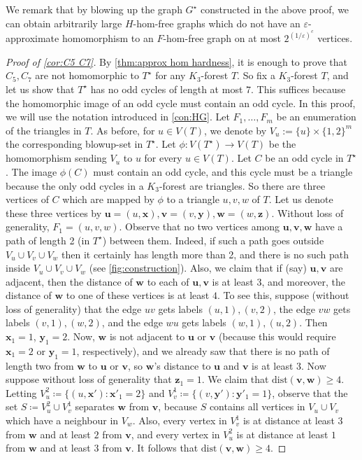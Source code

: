 \documentclass[reqno, english, 12pt]{amsart}
\theoremstyle{plain}
\theoremstyle{remark}
\newcommand{\bx}{\mathbf{x}}
\newcommand{\by}{\mathbf{y}}
\newcommand{\bz}{\mathbf{z}}
\renewcommand{\geq}{\geqslant}
\newcommand{\e}{\ensuremath{\varepsilon}}
\begin{document}
	We remark that by blowing up the graph $G^\star$ constructed in the above proof, we can obtain arbitrarily large $H$-hom-free graphs which do not have an $\e$-approximate homomorphism to an $F$-hom-free graph on at most $2^{(1/\e)^c}$ vertices.
	\begin{proof}[Proof of \cref{cor:C5 C7}]
	By \cref{thm:approx hom hardness}, it is enough to prove that $C_5,C_7$ are not homomorphic to $T^{\star}$ for any $K_3$-forest $T$. 
    So fix a $K_3$-forest $T$, and let us show that $T^{\star}$ has no odd cycles of length at most $7$. This suffices because the homomorphic image of an odd cycle must contain an odd cycle. In this proof, we will use the notation introduced in \cref{con:HG}.
    Let $F_1,\dots,F_m$ be an enumeration of the triangles in $T$.
	As before, for $u \in V(T)$, we denote by $V_u := \{u\} \times \{1,2\}^m$ the corresponding blowup-set in $T^{\star}$. Let $\phi : V(T^{\star}) \rightarrow V(T)$ be the homomorphism sending $V_u$ to $u$ for every $u \in V(T)$. Let $C$ be an odd cycle in $T^{\star}$. 
	The image $\phi(C)$ must contain an odd cycle, and this cycle must be a triangle because the only odd cycles in a $K_3$-forest are triangles. So there are three vertices of $C$ which are mapped by $\phi$ to a triangle $u,v,w$ of $T$. Let us denote these three vertices by $\mathbf{u} = (u,\bx),\mathbf{v} = (v,\by),\mathbf{w} = (w,\bz)$. Without loss of generality, $F_1 = (u,v,w)$. Observe that no two vertices among $\mathbf{u},\mathbf{v},\mathbf{w}$ have a path of length 2 
	(in $T^{\star}$) between them. Indeed, if such a path goes outside $V_u \cup V_v \cup V_w$ then it certainly has length more than 2, and there is no such path inside $V_u \cup V_v \cup V_w$ (see \cref{fig:construction}).
	Also, we claim that if (say) $\mathbf{u},\mathbf{v}$ are adjacent, then the distance of $\mathbf{w}$ to each of $\mathbf{u},\mathbf{v}$ is at least $3$, and moreover, the distance of $\mathbf{w}$ to one of these vertices is at least $4$.  To see this, suppose (without loss of generality) that the edge $uv$ gets labels $(u,1),(v,2)$, the edge $vw$ gets labels $(v,1),(w,2)$, and the edge $wu$ gets labels $(w,1),(u,2)$. Then $\bx_1 = 1$, $\by_1 = 2$. Now, $\mathbf{w}$ is not adjacent to $\mathbf{u}$ or $\mathbf{v}$ (because this would require $\bx_1 = 2$ or $\by_1 = 1$, respectively), and we already saw that there is no path of length two from $\mathbf{w}$ to $\mathbf{u}$ or $\mathbf{v}$, so $\mathbf{w}$'s distance to $\mathbf{u}$ and $\mathbf{v}$ is at least $3$. Now suppose without loss of generality that $\bz_1 = 1$. We claim that $\text{dist}(\mathbf{v},\mathbf{w}) \geq 4$. Letting $V_u^2 \coloneqq \{(u,\bx') : \bx'_1 = 2\}$ and $V_v^1 \coloneqq \{ (v,\by') : \by'_1 = 1 \}$,
	observe that the set $S \coloneqq V_u^2 \cup V_v^1$ separates $\mathbf{w}$ from $\mathbf{v}$, because $S$ contains all vertices in $V_u \cup V_v$ which have a neighbour in $V_w$. Also, every vertex in $V_v^1$ is at distance at least $3$ from $\mathbf{w}$ and at least $2$ from $\mathbf{v}$, and every vertex in $V_u^2$ is at distance at least $1$ from $\mathbf{w}$ and at least $3$ from $\mathbf{v}$. It follows that $\text{dist}(\mathbf{v},\mathbf{w}) \geq 4$.


\end{proof}
\end{document}
